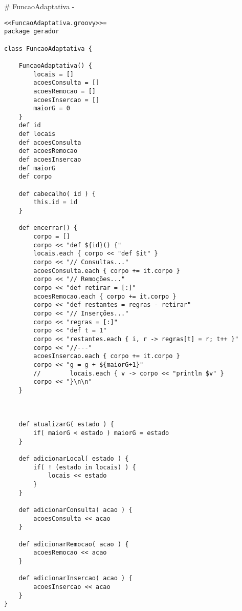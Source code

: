 # FuncaoAdaptativa {-}

\begin{lstlisting}
<<FuncaoAdaptativa.groovy>>=
package gerador

class FuncaoAdaptativa {

    FuncaoAdaptativa() {
        locais = []
        acoesConsulta = []
        acoesRemocao = []
        acoesInsercao = []
        maiorG = 0
    }
    def id
    def locais
    def acoesConsulta
    def acoesRemocao
    def acoesInsercao
    def maiorG
    def corpo

    def cabecalho( id ) {
        this.id = id
    }

    def encerrar() {
        corpo = []
        corpo << "def ${id}() {"
        locais.each { corpo << "def $it" }
        corpo << "// Consultas..."
        acoesConsulta.each { corpo += it.corpo }
        corpo << "// Remoções..."
        corpo << "def retirar = [:]"
        acoesRemocao.each { corpo += it.corpo }
        corpo << "def restantes = regras - retirar"
        corpo << "// Inserções..."
        corpo << "regras = [:]"
        corpo << "def t = 1"
        corpo << "restantes.each { i, r -> regras[t] = r; t++ }"
        corpo << "//---"
        acoesInsercao.each { corpo += it.corpo }
        corpo << "g = g + ${maiorG+1}"
        //        locais.each { v -> corpo << "println $v" }
        corpo << "}\n\n"
    }



    def atualizarG( estado ) {
        if( maiorG < estado ) maiorG = estado
    }

    def adicionarLocal( estado ) {
        if( ! (estado in locais) ) {
            locais << estado
        }
    }

    def adicionarConsulta( acao ) {
        acoesConsulta << acao
    }

    def adicionarRemocao( acao ) {
        acoesRemocao << acao
    }

    def adicionarInsercao( acao ) {
        acoesInsercao << acao
    }
}
\end{lstlisting}


